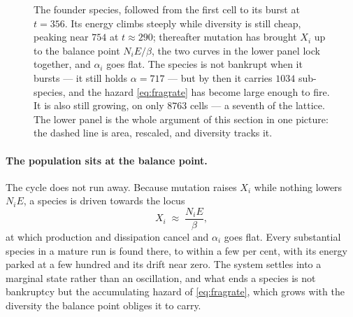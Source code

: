 \documentclass[11pt,a4paper]{article}
\begin{document}
\begin{figure}[t]
\centering
{}
\caption{The founder species, followed from the first cell to its burst at $t = 356$. Its
energy climbs steeply while diversity is still cheap, peaking near $754$ at $t \approx 290$;
thereafter mutation has brought $X_i$ up to the balance point $N_i E/\beta$, the two curves
in the lower panel lock together, and $\alpha_i$ goes flat. The species is not bankrupt when
it bursts --- it still holds $\alpha = 717$ --- but by then it carries $1034$ sub-species,
and the hazard \eqref{eq:fragrate} has become large enough to fire. It is also still
growing, on only $8763$ cells --- a seventh of the lattice. The lower panel is the whole
argument of this section in one picture: the dashed line is area, rescaled, and diversity
tracks it.}
\label{fig:cycle}
\end{figure}

\paragraph{The population sits at the balance point.} The cycle does not run away. Because
mutation raises $X_i$ while nothing lowers $N_i E$, a species is driven towards the
locus
\begin{equation}
  X_i \;\approx\; \frac{N_i E}{\beta},
\end{equation}
at which production and dissipation cancel and $\alpha_i$ goes flat. Every substantial
species in a mature run is found there, to within a few per cent, with its energy parked
at a few hundred and its drift near zero. The system settles into a marginal state rather
than an oscillation, and what ends a species is not bankruptcy but the accumulating
hazard of \eqref{eq:fragrate}, which grows with the diversity the balance point obliges
it to carry.
\end{document}
